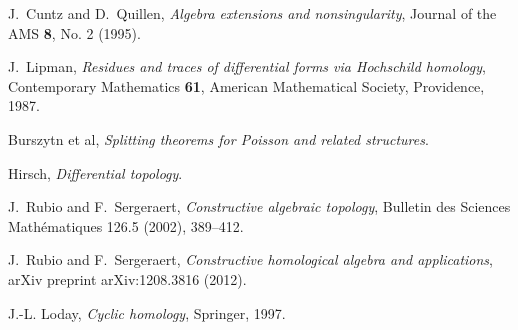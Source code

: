 \documentclass[english,letter paper,12pt,leqno]{article}
\theoremstyle{example}
\numberwithin{equation}{section}
\begin{document}
\begin{thebibliography}{BHLS03}
J.~Cuntz and D.~Quillen, \textsl{Algebra extensions and nonsingularity}, Journal of the AMS \textbf{8}, No. 2 (1995).

J.~Lipman, \textsl{Residues and traces of differential forms via {H}ochschild
  homology}, Contemporary Mathematics \textbf{61}, American Mathematical Society,
  Providence, 1987.

Burszytn et al, \textsl{Splitting theorems for Poisson and related structures}.

Hirsch, \textsl{Differential topology}.

J.~Rubio and F.~Sergeraert, \textsl{Constructive algebraic topology}, Bulletin des Sciences Math\'ematiques 126.5 (2002), 389--412.

J.~Rubio and F.~Sergeraert, \textsl{Constructive homological algebra and applications}, arXiv preprint arXiv:1208.3816 (2012).

J.-L. Loday, \textsl{Cyclic homology}, Springer, 1997.


\end{thebibliography}
\end{document}
